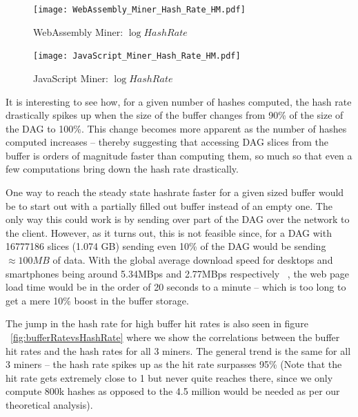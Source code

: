 \documentclass[runningheads]{llncs}
\begin{document}
\begin{figure}[h]
\centering
\texttt{[image: WebAssembly\_Miner\_Hash\_Rate\_HM.pdf]}
\caption{\label{fig:WebAsmMinerHM} WebAssembly Miner: $\log{Hash Rate}$}
\end{figure}

\begin{figure}[h]
\centering
\texttt{[image: JavaScript\_Miner\_Hash\_Rate\_HM.pdf]}
\caption{\label{fig:JSMinerHM} JavaScript Miner: $\log{Hash Rate}$}
\end{figure}


It is interesting to see how, for a given number of hashes computed, the hash rate drastically spikes up when the size of the buffer changes from 90\% of the size of the DAG to 100\%. This change becomes more apparent as the number of hashes computed increases -- thereby suggesting that accessing DAG slices from the buffer is orders of magnitude faster than computing them, so much so that even a few computations bring down the hash rate drastically. 

One way to reach the steady state hashrate faster for a given sized buffer would be to start out with a partially filled out buffer instead of an empty one. The only way this could work is by sending over part of the DAG over the network to the client. However, as it turns out, this is not feasible since, for a DAG with 16777186 slices (1.074 GB) sending even 10\% of the DAG would be sending $\approx100MB$ of data. With the global average download speed for desktops and smartphones being around 5.34MBps and 2.77MBps respectively ~\cite{internetSpeed}, the web page load time would be in the order of 20 seconds to a minute -- which is too long to get a mere 10\% boost in the buffer storage. 

The jump in the hash rate for high buffer hit rates is also seen in figure ~\ref{fig:bufferRatevsHashRate} where we show the correlations between the buffer hit rates and the hash rates for all 3 miners. The general trend is the same for all 3 miners -- the hash rate spikes up as the hit rate surpasses 95\% (Note that the hit rate gets extremely close to 1 but never quite reaches there, since we only compute 800k hashes as opposed to the 4.5 million would be needed as per our theoretical analysis).
\end{document}
